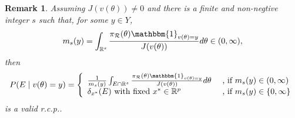 \documentclass[10pt]{article}
\newtheorem{remark}{Remark}
\newcommand{\be}{\begin{equation}\begin{aligned}}
\newcommand{\ee}{\end{aligned}\end{equation}}
\newcommand{\bb}[1]{\mathbb{#1}}
\newcommand{\mc}[1]{\mathcal{#1}}
\DeclareMathOperator{\1}{\mathbbm{1}}
\begin{document}
\begin{remark}
Assuming $J(v(\theta))\neq 0$ and there is a finite and
non-negtive integer $s$ such
that, for some $y\in Y$,
\be
m_s(y)=\int_{\bb R^s} \frac{\pi_{\mc
R}(\theta)
\mathbbm{1}_{v({\theta})=y}}{J(v(\theta))}d\theta\in(0,\infty),
\ee
then
\begin{equation}
P(E\mid v(\theta)=y)=\left\{\begin{array}{ll}  \frac{1}{m_s(y)}\int_{E \cap \bb R^s} \frac{\pi_{\mc
R}(\theta) \mathbbm{1}_{v({\theta})=y}}{J(v(\theta))}d\theta
& \text{  , if }m_s(y)\in(0,\infty) \\
\delta_{x^*}(E) \text{ with fixed } x^*\in \bb R^p
& \text{  , if }m_s(y)\in\{0,\infty\} \\
\end{array}\right.
\end{equation}
is a valid r.c.p..
\end{remark}
\end{document}
